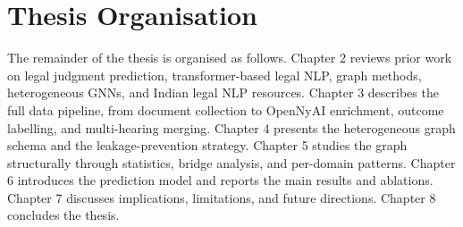 \section{Thesis Organisation}

The remainder of the thesis is organised as follows. Chapter 2 reviews prior work on legal judgment prediction, transformer-based legal NLP, graph methods, heterogeneous GNNs, and Indian legal NLP resources. Chapter 3 describes the full data pipeline, from document collection to OpenNyAI enrichment, outcome labelling, and multi-hearing merging. Chapter 4 presents the heterogeneous graph schema and the leakage-prevention strategy. Chapter 5 studies the graph structurally through statistics, bridge analysis, and per-domain patterns. Chapter 6 introduces the prediction model and reports the main results and ablations. Chapter 7 discusses implications, limitations, and future directions. Chapter 8 concludes the thesis.
